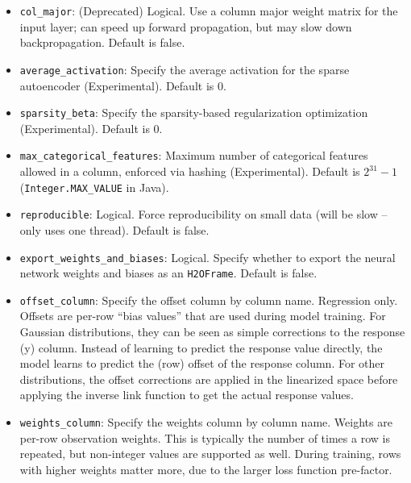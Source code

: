 \begin{itemize}
\item \texttt{col\_major}: (Deprecated) Logical. Use a column major weight matrix for the input layer; can speed up forward propagation, but may slow down backpropagation. Default is false.

\item \texttt{average\_activation}: Specify the average activation for the sparse autoencoder (Experimental).
Default is 0.

\item \texttt{sparsity\_beta}: Specify the sparsity-based regularization optimization (Experimental).  Default is 0. 

\item \texttt{max\_categorical\_features}:  Maximum number of categorical features allowed in a column, enforced via hashing (Experimental).  Default is $2^{31}-1$ (\texttt{Integer.MAX\_VALUE} in Java).

\item \texttt{reproducible}: Logical. Force reproducibility on small data (will be slow -- only uses one thread).  Default is false.

\item \texttt{export\_weights\_and\_biases}: Logical. Specify whether to export the neural network weights and biases as an \texttt{H2OFrame}.  Default is false.

%

\item \texttt{offset\_column}:  Specify the offset column by column name.  Regression only.  Offsets are per-row ``bias values'' that are used during model training. For Gaussian distributions, they can be seen as simple corrections to the response (y) column. Instead of learning to predict the response value directly, the model learns to predict the (row) offset of the response column. For other distributions, the offset corrections are applied in the linearized space before applying the inverse link function to get the actual response values. 

\item \texttt{weights\_column}: Specify the weights column by column name. Weights are per-row observation weights. This is typically the number of times a row is repeated, but non-integer values are supported as well. During training, rows with higher weights matter more, due to the larger loss function pre-factor.


\end{itemize}
